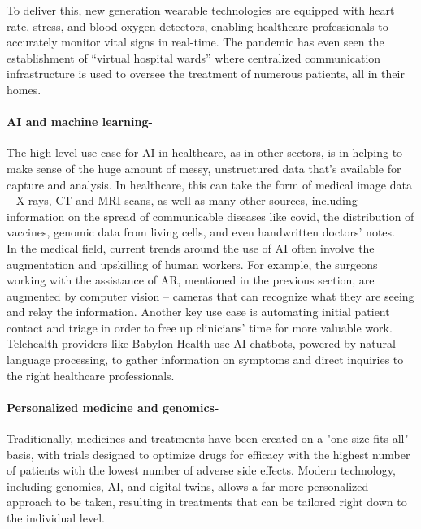 \documentclass[a4paper,12pt]{extarticle}
\begin{document}
To deliver this, new generation wearable technologies are equipped with heart rate, stress, and blood oxygen detectors, enabling healthcare professionals to accurately monitor vital signs in real-time. The pandemic has even seen the establishment of “virtual hospital wards” where centralized communication infrastructure is used to oversee the treatment of numerous patients, all in their homes.\\

\paragraph{AI and machine learning-} The high-level use case for AI in healthcare, as in other sectors, is in helping to make sense of the huge amount of messy, unstructured data that’s available for capture and analysis. In healthcare, this can take the form of medical image data – X-rays, CT and MRI scans, as well as many other sources, including information on the spread of communicable diseases like covid, the distribution of vaccines, genomic data from living cells, and even handwritten doctors' notes.\\

In the medical field, current trends around the use of AI often involve the augmentation and upskilling of human workers. For example, the surgeons working with the assistance of AR, mentioned in the previous section, are augmented by computer vision – cameras that can recognize what they are seeing and relay the information. Another key use case is automating initial patient contact and triage in order to free up clinicians' time for more valuable work. Telehealth providers like Babylon Health use AI chatbots, powered by natural language processing, to gather information on symptoms and direct inquiries to the right healthcare professionals.\\


\paragraph{Personalized medicine and genomics-}Traditionally, medicines and treatments have been created on a "one-size-fits-all" basis, with trials designed to optimize drugs for efficacy with the highest number of patients with the lowest number of adverse side effects. Modern technology, including genomics, AI, and digital twins, allows a far more personalized approach to be taken, resulting in treatments that can be tailored right down to the individual level.\\
\end{document}
